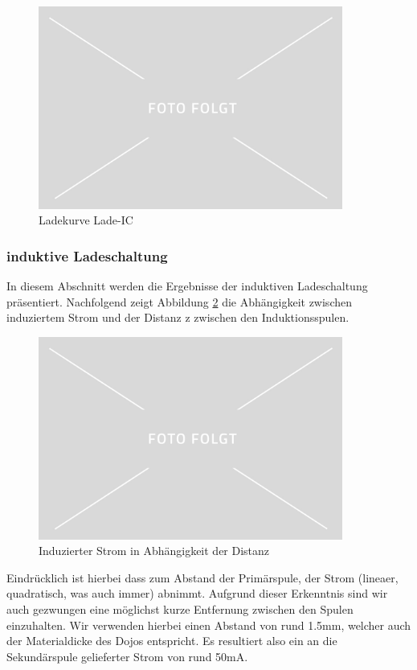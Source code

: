 \begin{figure}[H]
	\begin{center}
		\includegraphics[width=100mm]{data/Platzhalter.jpg}
		\caption[Ladekurve Lade-IC]{Ladekurve Lade-IC} %
		\label{fig:Ladekurve-LadeIC}
	\end{center}
\end{figure}


\subsubsection*{induktive Ladeschaltung}\label{sec:batterie}
In diesem Abschnitt werden die Ergebnisse der induktiven Ladeschaltung präsentiert. Nachfolgend zeigt Abbildung \ref{fig:InduzierterStrom} die Abhängigkeit zwischen induziertem Strom und der Distanz z zwischen den Induktionsspulen.

\begin{figure}[H]
	\begin{center}
		\includegraphics[width=100mm]{data/Platzhalter.jpg}
		\caption[Induzierter Strom in Abhängigkeit der Distanz]{Induzierter Strom in Abhängigkeit der Distanz} %
		\label{fig:InduzierterStrom}
	\end{center}
\end{figure}

Eindrücklich ist hierbei dass zum Abstand der Primärspule, der Strom (lineaer, quadratisch, was auch immer) abnimmt. Aufgrund dieser Erkenntnis sind wir auch gezwungen eine möglichst kurze Entfernung zwischen den Spulen einzuhalten. Wir verwenden hierbei einen Abstand von rund 1.5mm, welcher auch der Materialdicke des Dojos entspricht. Es resultiert also ein an die Sekundärspule gelieferter Strom von rund 50mA.
